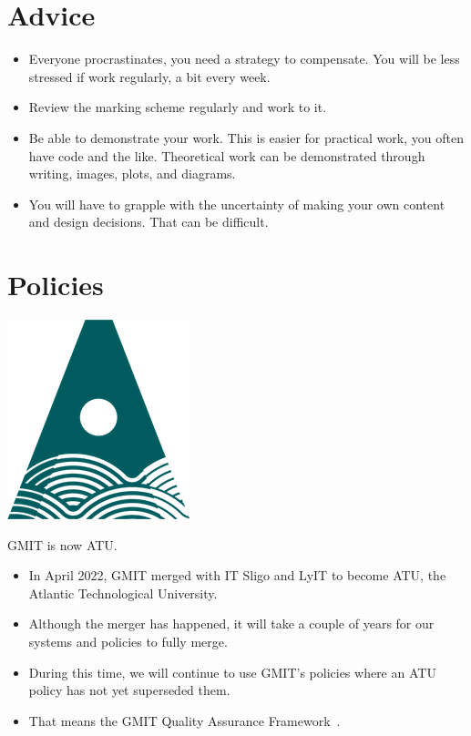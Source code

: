 \documentclass[a4paper]{tufte-handout}
\begin{document}
\section{Advice}

\begin{itemize}
  \item Everyone procrastinates, you need a strategy to compensate. You will be less stressed if work regularly, a bit every week.
  \item Review the marking scheme regularly and work to it.
  \item Be able to demonstrate your work. This is easier for practical work, you often have code and the like. Theoretical work can be demonstrated through writing, images, plots, and diagrams.
  \item You will have to grapple with the uncertainty of making your own content and design decisions. That can be difficult.
\end{itemize}


\section{Policies}

\begin{marginfigure}%
  \centering
  \includegraphics[width=0.6\linewidth]{img/atu-green.png}
  \caption*{GMIT is now ATU.}
  \label{fig:atulogo}
\end{marginfigure}

\begin{itemize}
  \item In April 2022, GMIT merged with IT Sligo and LyIT to become ATU, the Atlantic Technological University.
  \item Although the merger has happened, it will take a couple of years for our systems and policies to fully merge.
  \item During this time, we will continue to use GMIT's policies where an ATU policy has not yet superseded them.
  \item That means the GMIT Quality Assurance Framework~\cite{gmitqaf}.
\end{itemize} 



\end{document}
